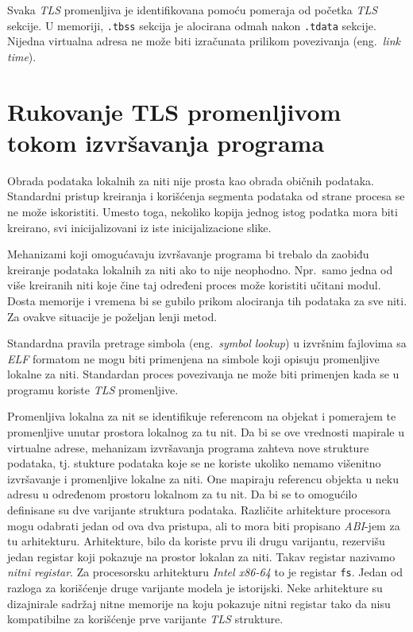 \documentclass[12pt,oneside]{memoir}
\begin{document}
Svaka \emph{TLS} promenljiva je identifikovana pomoću pomeraja od početka \emph{TLS} sekcije. U memoriji, \texttt{.tbss} sekcija je alocirana odmah nakon \texttt{.tdata} sekcije. Nijedna virtualna adresa ne može biti izračunata prilikom povezivanja (eng.~\emph{link time}).

\section{Rukovanje TLS promenljivom tokom izvršavanja programa}
\label{sec:izvrTls}

Obrada podataka lokalnih za niti nije prosta kao obrada običnih podataka. Standardni pristup kreiranja i korišćenja segmenta podataka od strane procesa se ne može iskoristiti. Umesto toga, nekoliko kopija jednog istog podatka mora biti kreirano, svi inicijalizovani iz iste inicijalizacione slike.

Mehanizami koji omogućavaju izvršavanje programa bi trebalo da zaobiđu kreiranje podataka lokalnih za niti ako to nije neophodno. Npr.~samo jedna od više kreiranih niti koje čine taj određeni proces
može koristiti učitani modul. Dosta memorije i vremena bi se gubilo prikom alociranja tih podataka za sve niti. Za ovakve situacije je poželjan lenji metod.

Standardna pravila pretrage simbola (eng.~\emph{symbol lookup}) u izvršnim fajlovima sa \emph{ELF} formatom ne mogu biti primenjena na simbole koji opisuju promenljive lokalne za niti. Standardan proces povezivanja ne može biti primenjen kada se u programu koriste \emph{TLS} promenljive.

Promenljiva lokalna za nit se identifikuje referencom na objekat i pomerajem te promenljive unutar prostora lokalnog za tu nit. Da bi se ove vrednosti mapirale u virtualne adrese, mehanizam izvršavanja programa zahteva nove strukture podataka, tj. stukture podataka koje se ne koriste ukoliko nemamo višenitno izvršavanje i promenljive lokalne za niti. One mapiraju referencu objekta u neku adresu u određenom prostoru lokalnom za tu nit. Da bi se to omogućilo definisane su dve varijante struktura podataka. Različite arhitekture procesora mogu odabrati jedan od ova dva pristupa, ali to mora biti propisano \emph{ABI}-jem za tu arhitekturu. Arhitekture, bilo da koriste prvu ili drugu varijantu, rezervišu jedan registar koji pokazuje na prostor lokalan za niti. Takav registar nazivamo \emph{nitni registar}. Za procesorsku arhitekturu \emph{Intel x86-64} to je registar \texttt{fs}. Jedan od razloga za korišćenje druge varijante modela je istorijski. Neke arhitekture su dizajnirale sadržaj nitne memorije na koju pokazuje nitni registar tako da nisu kompatibilne za korišćenje prve varijante \emph{TLS} strukture.
\end{document}
